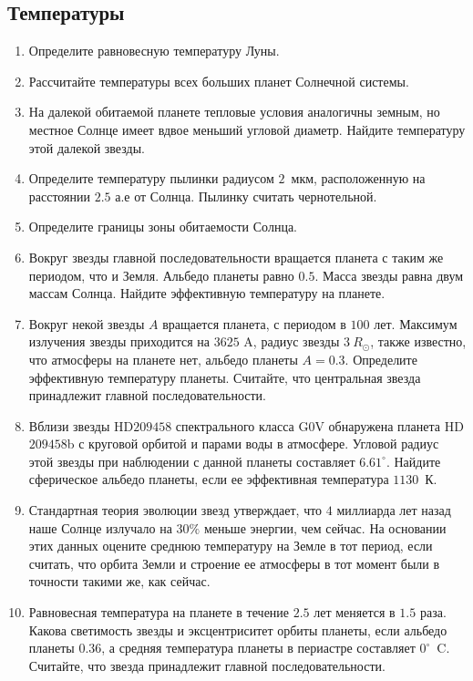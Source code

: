 \documentclass[12pt]{article}
\begin{document}
\subsection*{Температуры}
\begin{enumerate}[resume]
    \item Определите равновесную температуру Луны.
    \item Рассчитайте температуры всех больших планет Солнечной системы.
    \item На далекой обитаемой планете тепловые условия аналогичны земным, но местное Солнце имеет вдвое меньший угловой диаметр. Найдите температуру этой далекой звезды.
    \item Определите температуру пылинки радиусом $2$~мкм, расположенную на расстоянии $2.5$ а.е от Солнца. Пылинку считать чернотельной.
    \item Определите границы зоны обитаемости Солнца.
    \item Вокруг звезды главной последовательности вращается планета с таким же периодом, что и Земля. Альбедо планеты равно $0.5$. Масса звезды равна двум массам Солнца. Найдите эффективную температуру на планете.
    \item Вокруг некой звезды $A$ вращается планета, с периодом в $100$ лет. Максимум излучения звезды приходится на $3625$ A, радиус звезды $3~R_{\odot}$, также известно, что атмосферы на планете нет, альбедо планеты $A=0.3$. Определите эффективную температуру планеты. Считайте, что центральная звезда принадлежит главной последовательности.
    \item Вблизи звезды HD$209458$ спектрального класса G$0$V обнаружена планета HD$209458$b с круговой орбитой и парами воды в атмосфере. Угловой радиус этой звезды при наблюдении с данной планеты составляет $6.61^{\circ}$. Найдите сферическое альбедо планеты, если ее эффективная температура $1130$~К.
    \item Стандартная теория эволюции звезд утверждает, что $4$ миллиарда лет назад наше Солнце излучало на $30\%$ меньше энергии, чем сейчас. На основании этих данных оцените среднюю температуру на Земле в тот период, если считать, что орбита Земли и строение ее атмосферы в тот момент были в точности такими же, как сейчас.
    \item Равновесная температура на планете в течение $2.5$ лет меняется в $1.5$ раза. Какова светимость звезды и эксцентриситет орбиты планеты, если альбедо планеты $0.36$, а средняя температура планеты в периастре составляет $0^{\circ}$~C. Считайте, что звезда принадлежит главной последовательности.
\end{enumerate}
\end{document}
